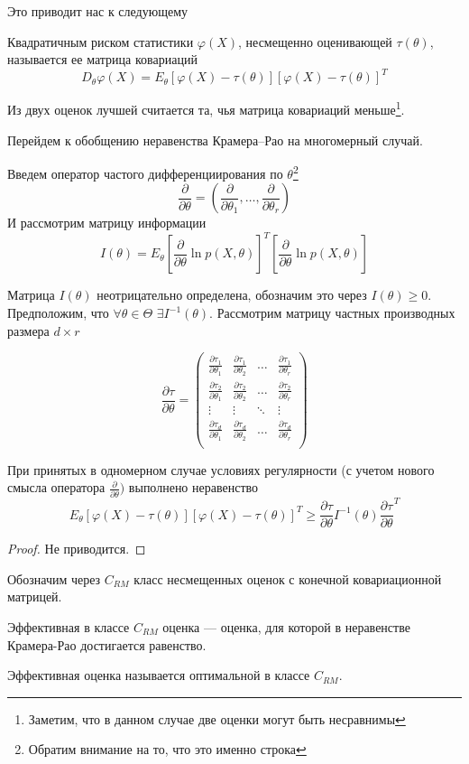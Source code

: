 \documentclass[12pt, russian]{article}
\begin{document}
Это приводит нас к следующему
\begin{mydef}
Квадратичным риском статистики $\varphi(X)$, несмещенно оценивающей $\tau(\theta)$, называется ее матрица ковариаций
$$ D_\theta\varphi(X) = E_\theta[\varphi(X) - \tau(\theta)][\varphi(X) - \tau(\theta)]^T $$
\end{mydef}

\noindent Из двух оценок лучшей считается та, чья матрица ковариаций меньше\footnote{Заметим, что в данном случае две оценки могут быть несравнимы}.

\noindent Перейдем к обобщению неравенства Крамера--Рао на многомерный случай. 

\noindent Введем оператор частого дифференциирования по $\theta$\footnote{Обратим внимание на то, что это именно строка}
$$ \frac{\partial}{\partial\theta} = \left(\frac{\partial}{\partial\theta_1},\ldots,\frac{\partial}{\partial\theta_r} \right)$$
И рассмотрим матрицу информации
$$ I(\theta) = E_\theta \left[\frac{\partial}{\partial\theta}\ln{p(X, \theta)}\right]^T \left[\frac{\partial}{\partial\theta}\ln{p(X, \theta)}\right]$$

Матрица $I(\theta)$ неотрицательно определена, обозначим это через $I(\theta)\geq 0$. Предположим, что $\forall\theta\in\Theta\,\,\exists I^{-1}(\theta)$. Рассмотрим матрицу частных производных размера $d\times r$

$$
\frac{\partial\tau}{\partial\theta} = \begin{pmatrix}
\frac{\partial\tau_1}{\partial\theta_1} & \frac{\partial\tau_1}{\partial\theta_2} &\ldots & \frac{\partial\tau_1}{\partial\theta_r} \\
\frac{\partial\tau_2}{\partial\theta_1} & \frac{\partial\tau_2}{\partial\theta_2} &\ldots & \frac{\partial\tau_2}{\partial\theta_r} \\       
\vdots & \vdots &\ddots & \vdots \\
\frac{\partial\tau_d}{\partial\theta_1} & \frac{\partial\tau_d}{\partial\theta_2} &\ldots & \frac{\partial\tau_d}{\partial\theta_r} \\ 
\end{pmatrix} 
$$

\begin{theorem}
При принятых в одномерном случае условиях регулярности (с учетом нового смысла оператора $\frac{\partial}{\partial\theta})$
выполнено неравенство 
$$ E_\theta[\varphi(X) - \tau(\theta)][\varphi(X) - \tau(\theta)]^T \geq \frac{\partial\tau}{\partial\theta} I^{-1}(\theta) \frac{\partial\tau}{\partial\theta}^T $$
\end{theorem}
\begin{proof}
Не приводится.
\end{proof}
\noindent Обозначим через $C_{RM}$ класс несмещенных оценок с конечной ковариационной матрицей. 
\begin{mydef}
Эффективная в классе $C_{RM}$ оценка --- оценка, для которой в неравенстве Крамера-Рао достигается равенство. 
\end{mydef}
\begin{mydef}
Эффективная оценка называется оптимальной в классе $C_{RM}$.
\end{mydef}
\end{document}
